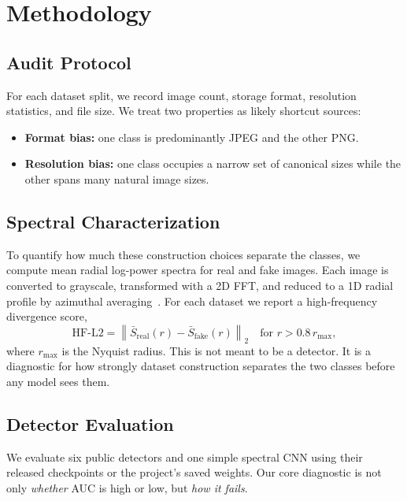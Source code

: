 \section{Methodology}
\label{sec:method}

\subsection{Audit Protocol}
\label{sec:audit_method}

For each dataset split, we record image count, storage format, resolution statistics, and file size. We treat two properties as likely shortcut sources:
\begin{itemize}
  \item \textbf{Format bias:} one class is predominantly JPEG and the other PNG.
  \item \textbf{Resolution bias:} one class occupies a narrow set of canonical sizes while the other spans many natural image sizes.
\end{itemize}

\subsection{Spectral Characterization}
\label{sec:spectral_method}

To quantify how much these construction choices separate the classes, we compute mean radial log-power spectra for real and fake images. Each image is converted to grayscale, transformed with a 2D FFT, and reduced to a 1D radial profile by azimuthal averaging~\cite{durall2020watch}. For each dataset we report a high-frequency divergence score,
\[
\mathrm{HF\text{-}L2} = \left\lVert \bar{S}_{\mathrm{real}}(r) - \bar{S}_{\mathrm{fake}}(r) \right\rVert_2
\quad \text{for } r > 0.8\,r_{\max},
\]
where $r_{\max}$ is the Nyquist radius. This is not meant to be a detector. It is a diagnostic for how strongly dataset construction separates the two classes before any model sees them.

\subsection{Detector Evaluation}
\label{sec:eval_method}

We evaluate six public detectors and one simple spectral CNN using their released checkpoints or the project's saved weights. Our core diagnostic is not only \emph{whether} AUC is high or low, but \emph{how it fails}.

